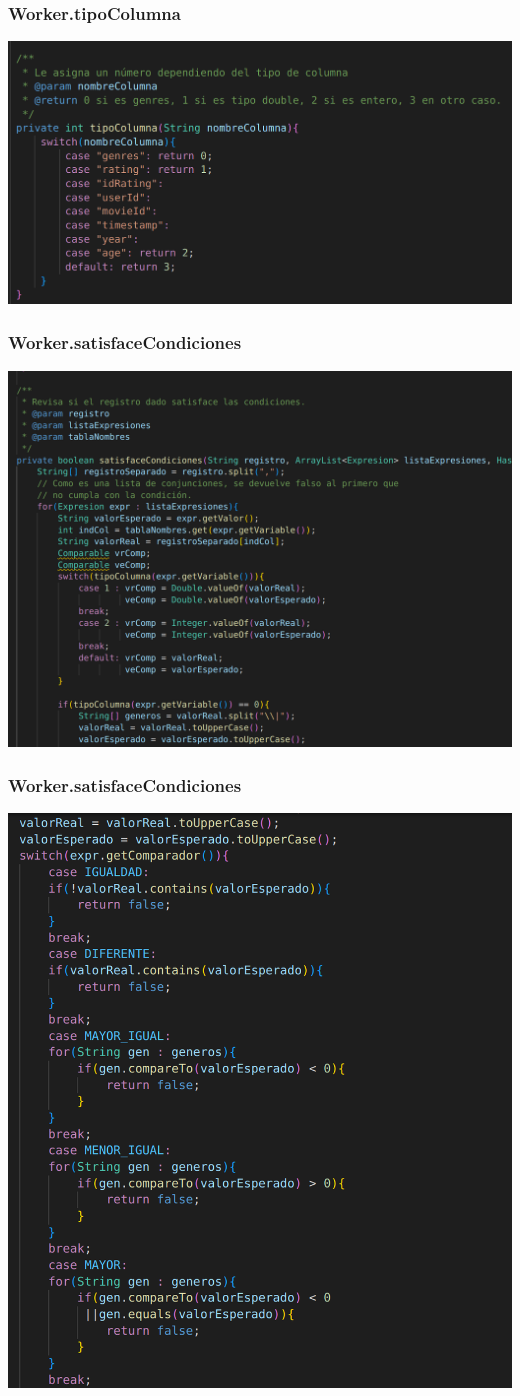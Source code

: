 \documentclass{beamer}
\begin{document}
\begin{frame}
\frametitle{Worker.tipoColumna}
\includegraphics[width=\linewidth]{worker_tipocolumna}
\end{frame}

\begin{frame}
\frametitle{Worker.satisfaceCondiciones}
\includegraphics[width=0.9\linewidth]{worker_satisfacecondiciones1}
\end{frame}

\begin{frame}
\frametitle{Worker.satisfaceCondiciones}
\includegraphics[width=0.7\linewidth]{worker_satisfacecondiciones2}
\end{frame}
\end{document}

